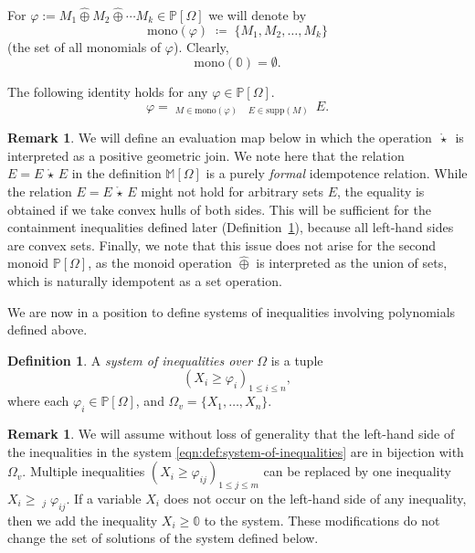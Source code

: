 \documentclass[10pt]{amsart}
\theoremstyle{plain}
\theoremstyle{definition}
\newtheorem{definition}[lemma]{Definition}
\newtheorem{remark}[lemma]{Remark}
\let\leq\leqslant
\let\geq\geqslant
\providecommand{\defeq}[0]{\ensuremath{\;\coloneqq\;}\xspace}
\providecommand{\cplus}[0]{\ensuremath{\hat{\oplus}}\xspace}
\providecommand{\Cplus}[0]{\ensuremath{\mathop{\widehat{\bigoplus}}}\xspace}
\providecommand{\cmult}[0]{\ensuremath{{\,\mathring{\star}\,}}\xspace}
\providecommand{\Cmult}[0]{\ensuremath{\mathop{\mathring{\bigstar}}}\xspace}
\providecommand{\mono}[0]{\ensuremath{\mathrm{mono}}\xspace}
\providecommand{\elem}[0]{\ensuremath{\mathrm{supp}}\xspace}
\let\phi\varphi
\begin{document}
For 
$
\varphi:= M_1 \cplus M_2 \cplus \dotsi M_k \in \mathbb{P}[\Omega]
$
we will denote by 
\[
\mono(\varphi)\defeq \{M_1, M_2, \dotsc, M_k\}
\]
(the set of all monomials of $\varphi$).
Clearly, 
\[
\mono(\mathbb{0}) = \emptyset.
\]

The following identity holds for any $\varphi \in \mathbb{P}[\Omega]$. 
    $$ \varphi = \Cplus_{M\in\mono(\varphi)} ~ \Cmult_{E\in\elem(M)} ~ E.$$


\begin{remark}
We will define an evaluation map below in which the operation $\cmult$ is interpreted as a positive geometric join. We note here that
the relation $E=E \cmult E$ in the definition $\mathbb{M}[\Omega]$ is a 
purely \emph{formal} idempotence relation. 
While the relation $E=E \cmult E$ might not hold for arbitrary sets $E$,
the equality is obtained if we take convex hulls of both sides.
This will be sufficient for the containment inequalities defined later
(Definition~\ref{def:system-of-inequalities}), 
because all left-hand sides are convex sets. 
Finally, we note that this issue does not arise for the second monoid $\mathbb{P}[\Omega]$, as the monoid operation $\cplus$ is interpreted as the union of sets, which is naturally idempotent as a set operation.
\end{remark}
We are now in a position to define systems of inequalities involving polynomials defined above.

\begin{definition}
\label{def:system-of-inequalities}
A {\em system of inequalities over $\Omega$} 
is a tuple
\begin{equation}
\label{eqn:def:system-of-inequalities}
\left(X_i \geq \varphi_i \right)_{1 \leq i \leq n},
\end{equation}
where each $\varphi_i \in \mathbb{P}[\Omega]$,
and $\Omega_v = \{X_1,\ldots,X_n\}$.
\end{definition}

\begin{remark}
    We will assume without loss of generality that the left-hand side of the inequalities in the system \eqref{eqn:def:system-of-inequalities} are in bijection with $\Omega_v$. Multiple inequalities $(X_i \geq \varphi_{ij})_{1 \leq j \leq m}$ can be replaced by one inequality $X_i \geq \Cplus_j \phi_{ij}$.
    If a variable $X_i$ does not occur on the left-hand side of any inequality, then we add the inequality $X_i \geq \mathbb{0}$ to the system. These modifications do not change the set of solutions of the system defined below.
\end{remark}
\end{document}
